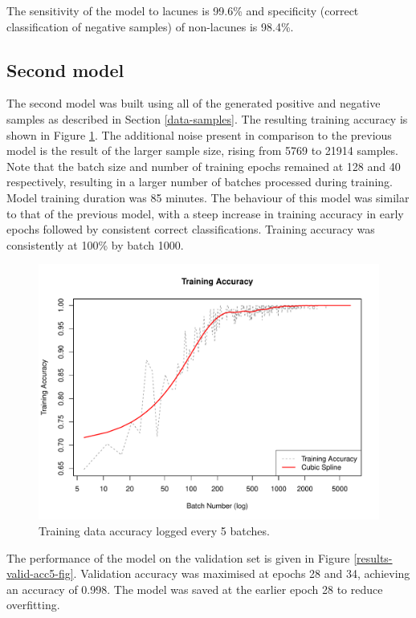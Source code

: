 The sensitivity of the model to lacunes is 99.6\% and specificity (correct classification of negative samples) of non-lacunes is 98.4\%.

\subsection*{Second model}

The second model was built using all of the generated positive and negative samples as described in Section \ref{data-samples}. The resulting training accuracy is shown in Figure \ref{results-train-acc5-fig}. The additional noise present in comparison to the previous model is the result of the larger sample size, rising from 5769 to 21914 samples. Note that the batch size and number of training epochs remained at 128 and 40 respectively, resulting in a larger number of batches processed during training. Model training duration was 85 minutes. The behaviour of this model was similar to that of the previous model, with a steep increase in training accuracy in early epochs followed by consistent correct classifications. Training accuracy was consistently at 100\% by batch 1000. 

\begin{figure}[ht]
	\centering
	\includegraphics[width=\textwidth]{Images/7_train_acc5.pdf}
	\caption{Training data accuracy logged every 5 batches.}
	\label{results-train-acc5-fig}
\end{figure}

The performance of the model on the validation set is given in Figure \ref{results-valid-acc5-fig}. Validation accuracy was maximised at epochs 28 and 34, achieving an accuracy of 0.998. The model was saved at the earlier epoch 28 to reduce overfitting.

